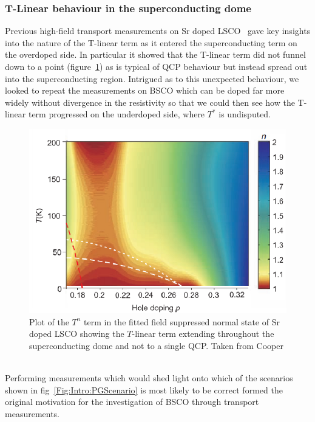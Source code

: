 \subsubsection{T-Linear behaviour in the superconducting dome}

Previous high-field transport measurements on Sr doped \ac{LSCO}~\cite{Cooper2009} gave key insights into the nature of the T-linear term as it entered the superconducting term on the overdoped side. In particular it showed that the T-linear term did not funnel down to a point (figure~\ref{Fig:Intro:CooperTLinear}) as is typical of \ac{QCP} behaviour but instead spread out into the superconducting region. Intrigued as to this unexpected behaviour, we looked to repeat the measurements on \ac{BSCO} which can be doped far more widely without divergence in the resistivity so that we could then see how the T-linear term progressed on the underdoped side, where $T^*$ is undisputed.
\begin{figure}[htbp]
    \begin{center}
        \includegraphics[scale=0.8]{Chapter-Introduction/Figures/CooperTLinear/CooperTLinear}
        \caption{Plot of the $T^n$ term in the fitted field suppressed normal state of Sr doped \ac{LSCO} showing the $T$-linear term extending throughout the superconducting dome and not to a single \ac{QCP}. Taken from Cooper \etal~\cite{Cooper2009}}
        \label{Fig:Intro:CooperTLinear}
    \end{center}
\end{figure}
Performing measurements which would shed light onto which of the scenarios shown in fig~\ref{Fig:Intro:PGScenario} is most likely to be correct formed the original motivation for the investigation of \ac{BSCO} through transport measurements. 

